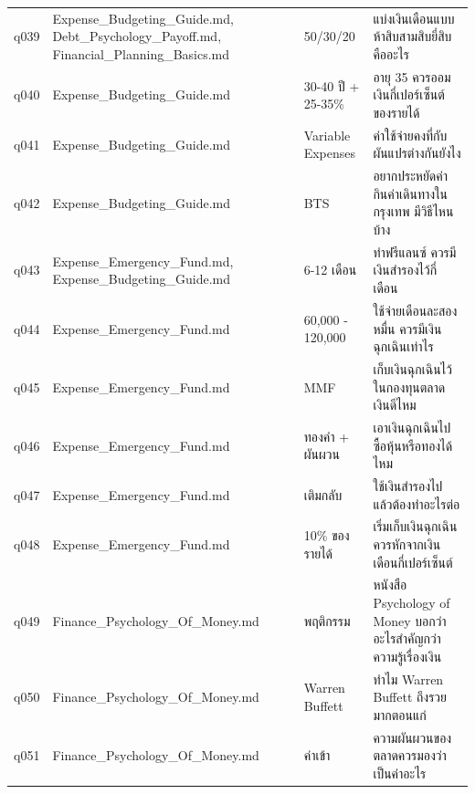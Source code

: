 \documentclass[11pt,a4paper]{article}
\begin{document}
{\begin{longtable}{lp{3.6cm}p{3.4cm}p{6.3cm}}
q039 & Expense\_\allowbreak{}Budgeting\_\allowbreak{}Guide.md, Debt\_\allowbreak{}Psychology\_\allowbreak{}Payoff.md, Financial\_\allowbreak{}Planning\_\allowbreak{}Basics.md & 50/30/20 & {\thaifont แบ่งเงินเดือนแบบห้าสิบสามสิบยี่สิบคืออะไร} \\
q040 & Expense\_\allowbreak{}Budgeting\_\allowbreak{}Guide.md & 30-40 {\thaifont ปี }+ 25-35\% & {\thaifont อายุ }35 {\thaifont ควรออมเงินกี่เปอร์เซ็นต์ของรายได้} \\
q041 & Expense\_\allowbreak{}Budgeting\_\allowbreak{}Guide.md & Variable Expenses & {\thaifont ค่าใช้จ่ายคงที่กับผันแปรต่างกันยังไง} \\
q042 & Expense\_\allowbreak{}Budgeting\_\allowbreak{}Guide.md & BTS & {\thaifont อยากประหยัดค่ากินค่าเดินทางในกรุงเทพ มีวิธีไหนบ้าง} \\
q043 & Expense\_\allowbreak{}Emergency\_\allowbreak{}Fund.md, Expense\_\allowbreak{}Budgeting\_\allowbreak{}Guide.md & 6-12 {\thaifont เดือน} & {\thaifont ทำฟรีแลนซ์ ควรมีเงินสำรองไว้กี่เดือน} \\
q044 & Expense\_\allowbreak{}Emergency\_\allowbreak{}Fund.md & 60,000 - 120,000 & {\thaifont ใช้จ่ายเดือนละสองหมื่น ควรมีเงินฉุกเฉินเท่าไร} \\
q045 & Expense\_\allowbreak{}Emergency\_\allowbreak{}Fund.md & MMF & {\thaifont เก็บเงินฉุกเฉินไว้ในกองทุนตลาดเงินดีไหม} \\
q046 & Expense\_\allowbreak{}Emergency\_\allowbreak{}Fund.md & {\thaifont ทองคำ }+ {\thaifont ผันผวน} & {\thaifont เอาเงินฉุกเฉินไปซื้อหุ้นหรือทองได้ไหม} \\
q047 & Expense\_\allowbreak{}Emergency\_\allowbreak{}Fund.md & {\thaifont เติมกลับ} & {\thaifont ใช้เงินสำรองไปแล้วต้องทำอะไรต่อ} \\
q048 & Expense\_\allowbreak{}Emergency\_\allowbreak{}Fund.md & 10\% {\thaifont ของรายได้} & {\thaifont เริ่มเก็บเงินฉุกเฉินควรหักจากเงินเดือนกี่เปอร์เซ็นต์} \\
q049 & Finance\_\allowbreak{}Psychology\_\allowbreak{}Of\_\allowbreak{}Money.md & {\thaifont พฤติกรรม} & {\thaifont หนังสือ }Psychology of Money {\thaifont บอกว่าอะไรสำคัญกว่าความรู้เรื่องเงิน} \\
q050 & Finance\_\allowbreak{}Psychology\_\allowbreak{}Of\_\allowbreak{}Money.md & Warren Buffett & {\thaifont ทำไม }Warren Buffett {\thaifont ถึงรวยมากตอนแก่} \\
q051 & Finance\_\allowbreak{}Psychology\_\allowbreak{}Of\_\allowbreak{}Money.md & {\thaifont ค่าเข้า} & {\thaifont ความผันผวนของตลาดควรมองว่าเป็นค่าอะไร} \\

\end{longtable}}
\end{document}
